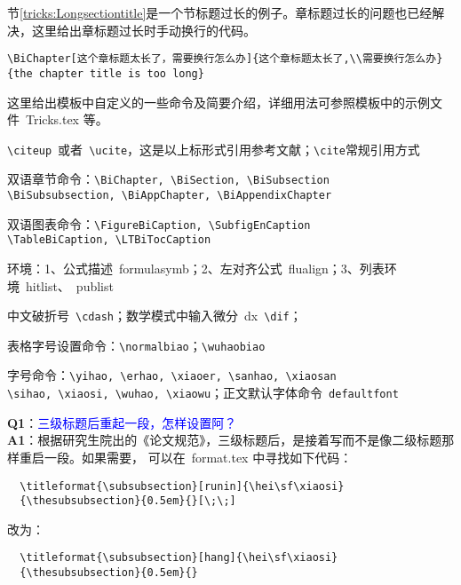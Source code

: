 \label{tricks:Longsectiontitle}

节\ref{tricks:Longsectiontitle}是一个节标题过长的例子。章标题过长的问题也已经解决，这里给出章标题过长时手动换行的代码。
\begin{verbatim}\BiChapter[这个章标题太长了，需要换行怎么办]{这个章标题太长了,\\需要换行怎么办}
{the chapter title is too long}\end{verbatim}

这里给出模板中自定义的一些命令及简要介绍，详细用法可参照模板中的示例文件~Tricks.tex 等。
\begin{hitlist}
\item \verb+\citeup+~或者~\verb+\ucite+，这是以上标形式引用参考文献；\verb+\cite+常规引用方式
\item 双语章节命令：\verb+\BiChapter, \BiSection, \BiSubsection+\\
\verb+\BiSubsubsection, \BiAppChapter, \BiAppendixChapter+
\item 双语图表命令：\verb+\FigureBiCaption, \SubfigEnCaption+\\
\verb+\TableBiCaption, \LTBiTocCaption+
\item 环境：1、公式描述~formulasymb；2、左对齐公式~flualign；3、列表环境~hitlist、~publist 
\item 中文破折号~\verb+\cdash+；数学模式中输入微分~dx~\verb+\dif+；
\item 表格字号设置命令：\verb+\normalbiao+；\verb+\wuhaobiao+
\item 字号命令：\verb+\yihao, \erhao, \xiaoer, \sanhao, \xiaosan+\\
\verb+\sihao, \xiaosi, \wuhao, \xiaowu+；正文默认字体命令~\verb+defaultfont+
\end{hitlist}


\noindent \textbf{Q1}：\textcolor{blue}{三级标题后重起一段，怎样设置阿？}\\
\textbf{A1}：根据研究生院出的《论文规范》，三级标题后，是接着写而不是像二级标题那样重启一段。如果需要，
可以在~format.tex 中寻找如下代码：
\begin{verbatim}
  \titleformat{\subsubsection}[runin]{\hei\sf\xiaosi}
  {\thesubsubsection}{0.5em}{}[\;\;]
\end{verbatim}
改为：
\begin{verbatim}
  \titleformat{\subsubsection}[hang]{\hei\sf\xiaosi}
  {\thesubsubsection}{0.5em}{}
\end{verbatim}

